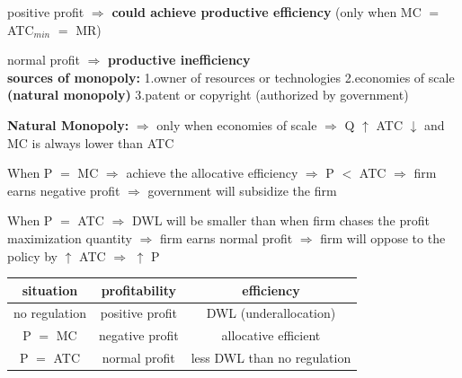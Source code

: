 \documentclass[UTF8]{article}
\begin{document}
positive profit $\Longrightarrow$ \textbf{could achieve productive efficiency} (only when MC $=$ ATC$_{min}$ $=$ MR)

normal profit $\Longrightarrow$ \textbf{productive inefficiency}\\

\textbf{sources of monopoly:} 1.owner of resources or technologies 2.economies of scale \textbf{(natural monopoly)} 3.patent or copyright (authorized by government)

\textbf{Natural Monopoly: }$\Longrightarrow$ only when economies of scale $\Longrightarrow$ Q $\uparrow$ ATC $\downarrow$ and MC is always lower than ATC

\newpage

\begin{figure}[!h]
\end{figure}

When P $=$ MC $\Longrightarrow$ achieve the allocative efficiency $\Longrightarrow$ P $<$ ATC $\Longrightarrow$ firm earns negative profit $\Longrightarrow$ government will subsidize the firm

When P $=$ ATC $\Longrightarrow$ DWL will be smaller than when firm chases the profit maximization quantity $\Longrightarrow$ firm earns normal profit $\Longrightarrow$ firm will oppose to the policy by $\uparrow$ ATC $\Longrightarrow$ $\uparrow$ P\\


\begin{tabular}{|c|c|c|}
    \hline
    situation & profitability & efficiency \\
    \hline
    no regulation & positive profit & DWL (underallocation)\\
    \hline
    P $=$ MC & negative profit & allocative efficient\\
    \hline
    P $=$ ATC & normal profit & less DWL than no regulation\\
    \hline
\end{tabular}\\
\end{document}
